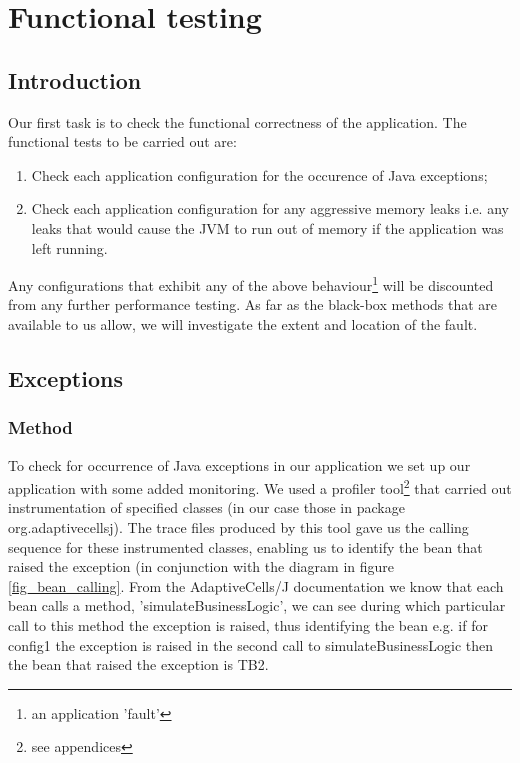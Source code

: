 \chapter{Functional testing}

\section{Introduction}

Our first task is to check the functional correctness of the application. The functional tests to be carried out are:
\begin{enumerate}
 \item Check each application configuration for the occurence of Java exceptions;
 \item Check each application configuration for any aggressive memory leaks i.e. any leaks that would cause the JVM to run out of memory if the application was left running.
\end{enumerate}

Any configurations that exhibit any of the above behaviour\footnote{an application 'fault'} will be discounted from any further performance testing. As far as the black-box methods that are available to us allow, we will investigate the extent and location of the fault.

\section{Exceptions}

\subsection{Method}

To check for occurrence of Java exceptions in our application we set up our application with some added monitoring. We used a profiler tool\footnote{see appendices} that carried out instrumentation of specified classes (in our case those in package org.adaptivecellsj). The trace files produced by this tool gave us the calling sequence for these instrumented classes, enabling us to identify the bean that raised the exception (in conjunction with the diagram in figure \ref{fig_bean_calling}. From the AdaptiveCells/J documentation we know that each bean calls a method, 'simulateBusinessLogic', we can see during which particular call to this method the exception is raised, thus identifying the bean e.g. if for config1 the exception is raised in the second call to simulateBusinessLogic then the bean that raised the exception is TB2.

